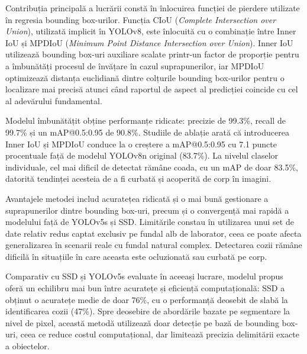 Contribuția principală a lucrării constă în înlocuirea funcției de pierdere  utilizate în regresia bounding box-urilor. Funcția CIoU (\textit{Complete Intersection over Union}), utilizată implicit în YOLOv8, este înlocuită cu o combinație între Inner IoU și MPDIoU (\textit{Minimum Point Distance Intersection over Union}). Inner IoU utilizează bounding box-uri auxiliare scalate printr-un factor de proporție pentru a îmbunătăți procesul de învățare în cazul suprapunerilor, iar MPDIoU optimizează distanța euclidiană dintre colțurile bounding box-urilor pentru o localizare mai precisă atunci când raportul de aspect al predicției coincide cu cel al adevărului fundamental.

Modelul îmbunătățit obține performanțe ridicate: precizie de 99.3\%, recall de 99.7\% și un mAP@0.5:0.95 de 90.8\%. Studiile de ablație arată că introducerea Inner IoU și MPDIoU conduce la o creștere a mAP@0.5:0.95 cu 7.1 puncte procentuale față de modelul YOLOv8n original (83.7\%). La nivelul claselor individuale, cel mai dificil de detectat rămâne coada, cu un mAP de doar 83.5\%, datorită tendinței acesteia de a fi curbată și acoperită de corp în imagini.

Avantajele metodei includ acuratețea ridicată și o mai bună gestionare a suprapunerilor dintre bounding box-uri, precum și o convergență mai rapidă a modelului față de YOLOv5s și SSD. Limitările constau în utilizarea unui set de date relativ redus captat exclusiv pe fundal alb de laborator, ceea ce poate afecta generalizarea în scenarii reale cu fundal natural complex. Detectarea cozii rămâne dificilă în situațiile în care aceasta este ocluzionată sau curbată pe corp.

Comparativ cu SSD și YOLOv5s evaluate în aceeași lucrare, modelul propus oferă un echilibru mai bun între acuratețe și eficiență computațională: SSD a obținut o acuratețe medie de doar 76\%, cu o performanță deosebit de slabă la identificarea cozii (47\%). Spre deosebire de abordările bazate pe segmentare la nivel de pixel, această metodă utilizează doar detecție pe bază de bounding box-uri, ceea ce reduce costul computațional, dar limitează precizia delimitării exacte a obiectelor.

